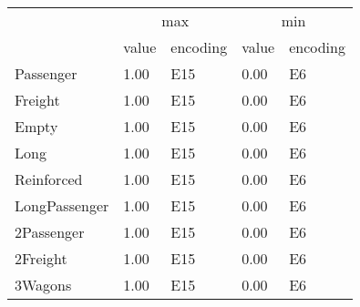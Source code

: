\begin{tabular}{lllll}
\toprule
 & \multicolumn{2}{c}{max} & \multicolumn{2}{c}{min} \\
 & value & encoding & value & encoding \\
\midrule
Passenger & 1.00 & E15 & 0.00 & E6 \\
Freight & 1.00 & E15 & 0.00 & E6 \\
Empty & 1.00 & E15 & 0.00 & E6 \\
Long & 1.00 & E15 & 0.00 & E6 \\
Reinforced & 1.00 & E15 & 0.00 & E6 \\
LongPassenger & 1.00 & E15 & 0.00 & E6 \\
2Passenger & 1.00 & E15 & 0.00 & E6 \\
2Freight & 1.00 & E15 & 0.00 & E6 \\
3Wagons & 1.00 & E15 & 0.00 & E6 \\
\bottomrule
\end{tabular}
